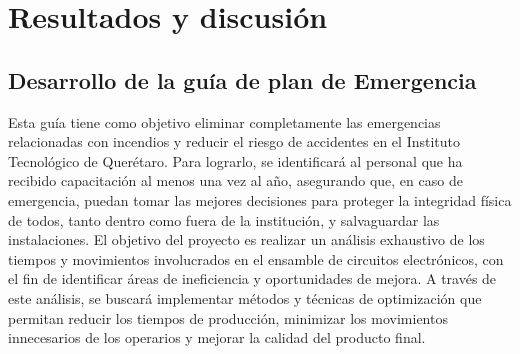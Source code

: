 

% 
% 

\section{Resultados y discusión}

\subsection{Desarrollo de la guía de plan de Emergencia}

Esta guía tiene como objetivo eliminar completamente las emergencias relacionadas con incendios y reducir el riesgo de accidentes en el Instituto Tecnológico de Querétaro. Para lograrlo, se identificará al personal que ha recibido capacitación al menos una vez al año, asegurando que, en caso de emergencia, puedan tomar las mejores decisiones para proteger la integridad física de todos, tanto dentro como fuera de la institución, y salvaguardar las instalaciones.
El objetivo del proyecto es realizar un análisis exhaustivo de los tiempos y movimientos involucrados en el ensamble de circuitos electrónicos, con el fin de identificar áreas de ineficiencia y oportunidades de mejora. A través de este análisis, se buscará implementar métodos y técnicas de optimización que permitan reducir los tiempos de producción, minimizar los movimientos innecesarios de los operarios y mejorar la calidad del producto final.
%
%

